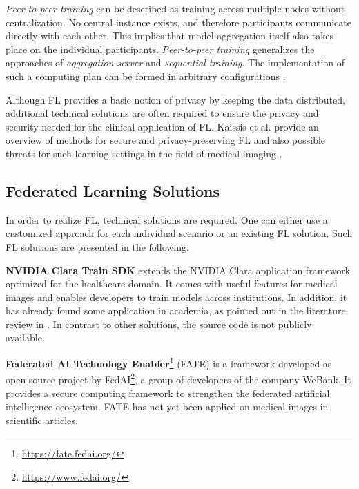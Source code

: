 \textit{Peer-to-peer training} can be described as training across multiple nodes without centralization. No central instance exists, and therefore participants communicate directly with each other. This implies that model aggregation itself also takes place on the individual participants.
\textit{Peer-to-peer training} generalizes the approaches of \textit{aggregation server} and \textit{sequential training}. The implementation of such a computing plan can be formed in arbitrary configurations \citep{Chang2018DistributedImaging, Lalitha2019Peer-to-peerGraphs, Roy2019BrainTorrent:Learning}.

Although FL provides a basic notion of privacy by keeping the data distributed, additional technical solutions are often required to ensure the privacy and security needed for the clinical application of FL. Kaissis et al. provide an overview of methods for secure and privacy-preserving FL and also possible threats for such learning settings in the field of medical imaging \citep{Kaissis2020SecureImaging}.



\subsection{Federated Learning Solutions}
\label{subsec:SolutionsFL}

In order to realize FL, technical solutions are required. One can either use a customized approach for each individual scenario or an existing FL solution. Such FL solutions are presented in the following. %

\textbf{NVIDIA Clara Train SDK}
extends the NVIDIA Clara application framework optimized for the healthcare domain. It comes with useful features for medical images and enables developers to train models across institutions. In addition, it has already found some application in academia, as pointed out in the literature review in . In contrast to other solutions, the source code is not publicly available.

\textbf{Federated AI Technology Enabler}\footnote{\url{https://fate.fedai.org/}}
(FATE) is a framework developed as open-source project by FedAI\footnote{\url{https://www.fedai.org/}}, a group of developers of the company WeBank. It provides a secure computing framework to strengthen the federated artificial intelligence ecosystem.
FATE has not yet been applied on medical images in scientific articles.


